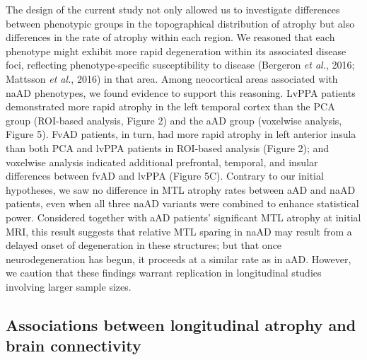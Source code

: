 \documentclass[]{article}
\begin{document}
The design of the current study not only allowed us to investigate
differences between phenotypic groups in the topographical distribution
of atrophy but also differences in the rate of atrophy within each
region. We reasoned that each phenotype might exhibit more rapid
degeneration within its associated disease foci, reflecting
phenotype-specific susceptibility to disease (Bergeron \emph{et al.},
2016; Mattsson \emph{et al.}, 2016) in that area. Among neocortical
areas associated with naAD phenotypes, we found evidence to support this
reasoning. LvPPA patients demonstrated more rapid atrophy in the left
temporal cortex than the PCA group (ROI-based analysis, Figure 2) and
the aAD group (voxelwise analysis, Figure 5). FvAD patients, in turn,
had more rapid atrophy in left anterior insula than both PCA and lvPPA
patients in ROI-based analysis (Figure 2); and voxelwise analysis
indicated additional prefrontal, temporal, and insular differences
between fvAD and lvPPA (Figure 5C). Contrary to our initial hypotheses,
we saw no difference in MTL atrophy rates between aAD and naAD patients,
even when all three naAD variants were combined to enhance statistical
power. Considered together with aAD patients' significant MTL atrophy at
initial MRI, this result suggests that relative MTL sparing in naAD may
result from a delayed onset of degeneration in these structures; but
that once neurodegeneration has begun, it proceeds at a similar rate as
in aAD. However, we caution that these findings warrant replication in
longitudinal studies involving larger sample sizes.

\subsection*{Associations between longitudinal atrophy and brain
connectivity}\label{associations-between-longitudinal-atrophy-and-brain-connectivity}
\end{document}
